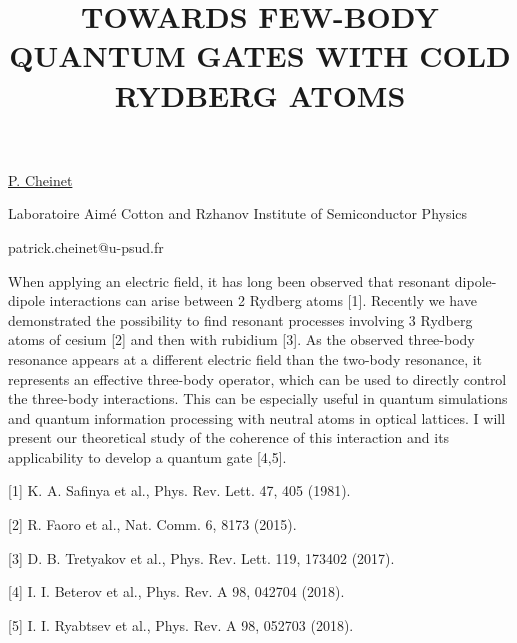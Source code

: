 \title{TOWARDS FEW-BODY QUANTUM GATES WITH COLD RYDBERG ATOMS}

\underline{P. Cheinet}  

{\normalsize{\vspace{-4mm}
Laboratoire Aim\'e Cotton and Rzhanov Institute of Semiconductor Physics 



\email patrick.cheinet@u-psud.fr}}


When applying an electric field, it has long been observed that resonant dipole-dipole interactions can arise between 2 Rydberg atoms [1]. Recently we have demonstrated the possibility to find resonant processes involving 3 Rydberg atoms of cesium [2] and then with rubidium [3]. 
As the observed three-body resonance appears at a different electric field than the two-body resonance, it represents an effective three-body operator, which can be used to directly control the three-body interactions. This can be especially useful in quantum simulations and quantum information processing with neutral atoms in optical lattices. I will present our theoretical study of the coherence of this interaction and its applicability to develop a quantum gate [4,5].

{\normalsize
[1] K. A. Safinya et al., Phys. Rev. Lett. 47, 405 (1981). 
\vsp

[2] R. Faoro et al., Nat. Comm. 6, 8173 (2015). 
\vsp

[3] D. B. Tretyakov et al., Phys. Rev. Lett. 119, 173402 (2017).
\vsp

[4] I. I. Beterov et al., Phys. Rev. A 98, 042704 (2018).
\vsp

[5] I. I. Ryabtsev et al., Phys. Rev. A 98, 052703 (2018).
}

\vspace{\baselineskip}
